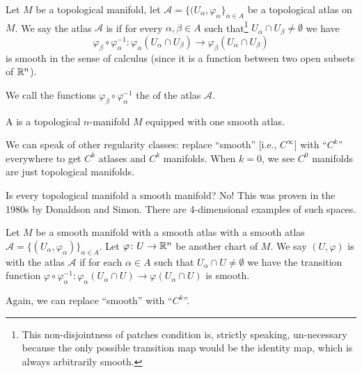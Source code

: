 \begin{definition}
Let $M$ be a topological manifold, let
$\mathcal{A}=\{(U_{\alpha},\varphi_{\alpha}\}_{\alpha\in A}$ be a
topological atlas on $M$. We say the atlas $\mathcal{A}$ is
 if for every $\alpha,\beta\in A$ such
that\footnote{This non-disjointness of patches condition is, strictly
speaking, un-necessary because the only possible transition map would
be the identity map, which is always arbitrarily smooth.}
$U_{\alpha}\cap U_{\beta}\neq\emptyset$ we have
\begin{equation}
\varphi_{\beta}\circ\varphi_{\alpha}^{-1}\colon\varphi_{\alpha}(U_{\alpha}\cap U_{\beta})\to\varphi_{\beta}(U_{\alpha}\cap U_{\beta})
\end{equation}
is smooth in the sense of calculus (since it is a function between two
open subsets of $\mathbb{R}^{n}$).

We call the functions $\varphi_{\beta}\circ\varphi_{\alpha}^{-1}$ the
 of the atlas $\mathcal{A}$.
\end{definition}

\begin{definition}
A  is a topological $n$-manifold $M$
equipped with one smooth atlas.

We can speak of other regularity classes: replace ``smooth'' [i.e.,
  $C^{\infty}$] with ``$C^{k}$'' everywhere to get $C^{k}$ atlases and
$C^{k}$ manifolds. When $k=0$, we see $C^{0}$ manifolds are just
topological manifolds.
\end{definition}

\begin{node}
Is every topological manifold a smooth manifold? No! This was proven
in the 1980s by Donaldson and Simon. There are 4-dimensional examples
of such spaces.
\end{node}

\begin{definition}[Compatibility]
Let $M$ be a smooth manifold with a smooth atlas with a smooth atlas
$\mathcal{A}=\{(U_{\alpha},\varphi_{\alpha})\}_{\alpha\in A}$. Let
$\varphi\colon U\to\mathbb{R}^{n}$ be another chart of $M$. We say
$(U,\varphi)$ is  with the atlas $\mathcal{A}$ if
for each $\alpha\in A$ such that $U_{\alpha}\cap U\neq\emptyset$ we
have the transition function $\varphi\circ\varphi_{\alpha}^{-1}\colon\varphi_{\alpha}(U_{\alpha}\cap U)\to\varphi(U_{\alpha}\cap U)$
is smooth.

Again, we can replace ``smooth'' with ``$C^{k}$''.
\end{definition}

